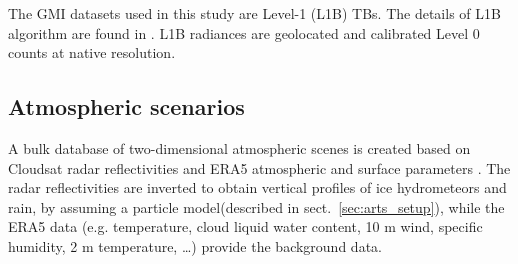 \documentclass[amt, manuscript]{copernicus}
\begin{document}
The GMI datasets used in this study are Level-1 (L1B) TBs. The details of L1B algorithm are found in \citet{}. L1B radiances are geolocated and calibrated Level 0 counts at native resolution. 








\subsection{Atmospheric scenarios}
\label{sec:atm_scenes}

A bulk database of two-dimensional atmospheric scenes is created based on Cloudsat radar reflectivities \citep{marchand:hydro:08} and ERA5 atmospheric and surface parameters \citep{era5:18}. The radar reflectivities are inverted to obtain vertical profiles of ice hydrometeors and rain, by assuming a particle model(described in sect.~\ref{sec:arts_setup}), while the ERA5 data (e.g. temperature, cloud liquid water content, 10\,\,m wind, specific humidity, 2\,\,m temperature, \dots) provide the background data.
\end{document}
